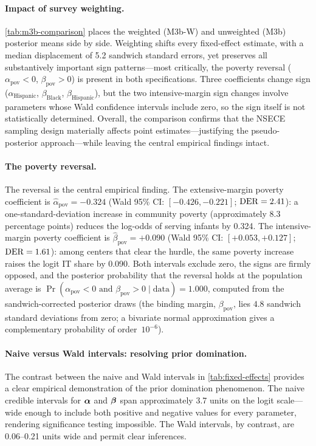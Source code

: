 \paragraph{Impact of survey weighting.}
\cref{tab:m3b-comparison} places the weighted (M3b-W) and unweighted
(M3b) posterior means side by side.  Weighting shifts every
fixed-effect estimate, with a median displacement of 5.2 sandwich
standard errors, yet preserves all substantively important sign
patterns---most critically, the poverty reversal
($\alpha_{\mathrm{pov}} < 0$, $\beta_{\mathrm{pov}} > 0$) is present in
both specifications.  Three coefficients change sign
($\alpha_{\mathrm{Hispanic}}$, $\beta_{\mathrm{Black}}$,
$\beta_{\mathrm{Hispanic}}$), but the two intensive-margin sign changes
involve parameters whose Wald confidence intervals include zero, so the
sign itself is not statistically determined.  Overall, the comparison
confirms that the NSECE sampling design materially affects
point estimates---justifying the pseudo-posterior approach---while
leaving the central empirical findings intact.



\paragraph{The poverty reversal.}
The reversal is the central empirical finding. The extensive-margin
poverty coefficient is $\hat{\alpha}_{\mathrm{pov}} = -0.324$ (Wald 95\% CI:
$[-0.426, -0.221]$; $\operatorname{DER} = 2.41$): a one-standard-deviation increase in
community poverty (approximately 8.3 percentage points) reduces the log-odds
of serving infants by 0.324. The intensive-margin poverty coefficient is
$\hat{\beta}_{\mathrm{pov}} = +0.090$ (Wald 95\% CI:
$[+0.053, +0.127]$; $\operatorname{DER} = 1.61$): among centers that clear the hurdle,
the same poverty increase raises the logit IT share by 0.090. Both intervals
exclude zero, the signs are firmly opposed, and the posterior probability
that the reversal holds at the population average is
$\Pr(\alpha_{\mathrm{pov}} < 0 \text{ and } \beta_{\mathrm{pov}} > 0
\mid \text{data}) = 1.000$,
computed from the sandwich-corrected posterior draws
(the binding margin, $\beta_{\mathrm{pov}}$, lies $4.8$
sandwich standard deviations from zero; a bivariate normal
approximation gives a complementary probability of order~$10^{-6}$).

\paragraph{Naive versus Wald intervals: resolving prior domination.}
The contrast between the naive and Wald intervals in
\cref{tab:fixed-effects} provides a clear empirical demonstration of
the prior domination phenomenon. The naive
credible intervals for $\boldsymbol{\alpha}$ and $\boldsymbol{\beta}$ span approximately 3.7 units
on the logit scale---wide enough to include both positive and negative values
for every parameter, rendering significance testing impossible. The Wald
intervals, by contrast, are 0.06--0.21 units wide and permit clear
inferences.

